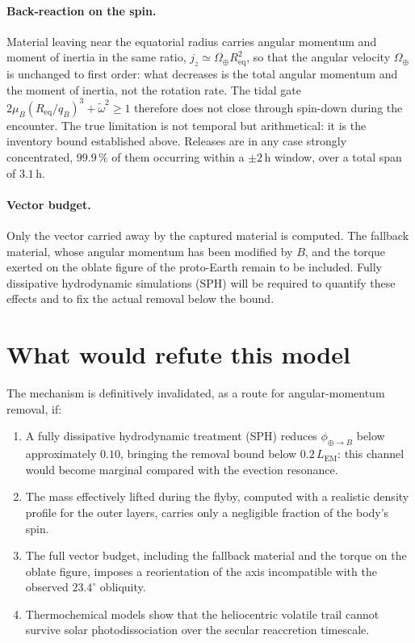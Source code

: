 \documentclass[11pt,a4paper]{article}
\begin{document}
\paragraph{Back-reaction on the spin.}
Material leaving near the equatorial radius carries angular momentum and moment of inertia in the same ratio, $j_z\simeq\Omega_\oplus R_{\mathrm{eq}}^{2}$, so that the angular velocity $\Omega_\oplus$ is unchanged to first order: what decreases is the total angular momentum and the moment of inertia, not the rotation rate. The tidal gate $2\mu_B(R_{\mathrm{eq}}/q_B)^3+\tilde{\omega}^2\ge1$ therefore does not close through spin-down during the encounter. The true limitation is not temporal but arithmetical: it is the inventory bound established above. Releases are in any case strongly concentrated, $99.9\,\%$ of them occurring within a $\pm2\,\mathrm{h}$ window, over a total span of $3.1\,\mathrm{h}$.

\paragraph{Vector budget.}
Only the vector carried away by the captured material is computed. The fallback material, whose angular momentum has been modified by $B$, and the torque exerted on the oblate figure of the proto-Earth remain to be included. Fully dissipative hydrodynamic simulations (SPH) will be required to quantify these effects and to fix the actual removal below the bound.

\section{What would refute this model}

The mechanism is definitively invalidated, as a route for angular-momentum removal, if:
\begin{enumerate}
    \item A fully dissipative hydrodynamic treatment (SPH) reduces $\phi_{\oplus\to B}$ below approximately $0.10$, bringing the removal bound below $0.2\,L_{\mathrm{EM}}$: this channel would become marginal compared with the evection resonance.
    \item The mass effectively lifted during the flyby, computed with a realistic density profile for the outer layers, carries only a negligible fraction of the body's spin.
    \item The full vector budget, including the fallback material and the torque on the oblate figure, imposes a reorientation of the axis incompatible with the observed $23.4^\circ$ obliquity.
    \item Thermochemical models show that the heliocentric volatile trail cannot survive solar photodissociation over the secular reaccretion timescale.
\end{enumerate}
\end{document}

